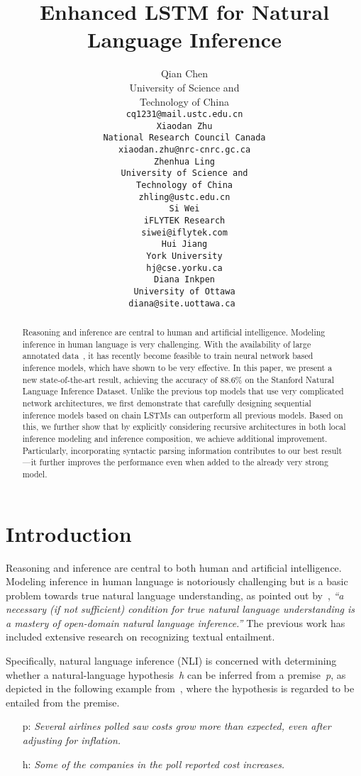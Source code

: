 \documentclass[11pt,a4paper]{article}
\title{Enhanced LSTM for Natural Language Inference}
\author{
Qian Chen \\
University of Science and \\ 
Technology of China\\
\tt{cq1231@mail.ustc.edu.cn} \\\And
Xiaodan Zhu \\
National Research Council Canada \\
\tt{xiaodan.zhu@nrc-cnrc.gc.ca} \\\AND
Zhenhua Ling \\
University of Science and \\
Technology of China\\
\tt{zhling@ustc.edu.cn} \\\And
Si Wei \\
iFLYTEK Research\\
\tt{siwei@iflytek.com} \\\AND
Hui Jiang \\
York University\\
\tt{hj@cse.yorku.ca} \\\And 
Diana Inkpen \\
University of Ottawa\\
\tt{diana@site.uottawa.ca}
}
\date{}
\begin{document}
\maketitle
\begin{abstract}

Reasoning and inference are central to human and artificial intelligence. Modeling inference in human language is very challenging. With the availability of large annotated data~\citep{Bowman:D15-1075}, it has recently become feasible to train neural network based inference models, which have shown to be very effective. In this paper, we present a new state-of-the-art result, achieving the accuracy of 88.6\% on the Stanford Natural Language Inference Dataset. Unlike the previous top models that use very complicated network architectures, we first demonstrate that carefully designing sequential inference models based on chain LSTMs can outperform all previous models. Based on this, we further show that by explicitly considering recursive architectures in both local inference modeling and inference composition, we achieve additional improvement. Particularly, incorporating syntactic parsing information contributes to our best result---it further improves the performance even when added to the already very strong model. 

\end{abstract}

\section{Introduction}
Reasoning and inference are central to both human and artificial intelligence. Modeling inference in human language is notoriously challenging but is a basic problem towards true natural language understanding, as pointed out by~\citet{MacCartney:2008}, \textit{``a necessary (if not sufficient) condition for true natural language understanding is a mastery of open-domain natural language inference.''} The previous work has included extensive research on recognizing textual entailment.

Specifically, natural language inference (NLI) is concerned with determining whether a natural-language hypothesis~\textit{h} can be inferred from a premise~\textit{p}, as depicted in the following example from~\citet{MacCartneyThesis}, where the hypothesis is regarded to be entailed from the premise.

\begin{itemize}[leftmargin=4.0mm,rightmargin=0mm]
\setlength\itemsep{0.4em}
	\item [p:] \textit{Several airlines polled saw costs grow more than expected, even after adjusting for inflation.} 
	\item [h:] \textit{Some of the companies in the poll reported cost increases.} 
\end{itemize}
\end{document}
